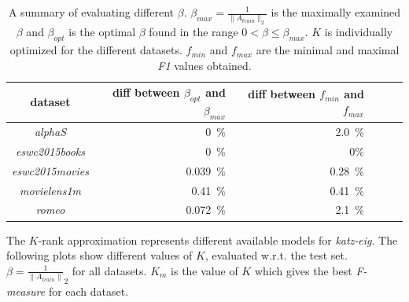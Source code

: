 \begin{table}[h!]
    \centering
    \begin{tabular}{| c | r | r | r | r | l |}
        \hline
        \textbf{dataset}        & \textbf{diff between $\beta_{opt}$ and $\beta_{max}$ }    & \textbf{diff between $f_{min}$ and $f_{max}$} \\ \hline

        \textit{alphaS}         & 0~\%      & 2.0~\%    \\ \hline
        \textit{eswc2015books}  & 0~\%      & 0\%       \\ \hline
        \textit{eswc2015movies} & 0.039~\%  & 0.28~\%   \\ \hline
        \textit{movielens1m}    & 0.41~\%   & 0.41~\%   \\ \hline
        \textit{romeo}          & 0.072~\%  & 2.1~\%    \\ \hline


    \end{tabular}
    \caption{A summary of evaluating different $\beta$. $\beta_{max} = \frac{1}{\|A_{train}\|_2}$ is the maximally examined $\beta$ and $\beta_{opt}$ is the optimal $\beta$ found in the range $0 < \beta \leq \beta_{max}$. $K$ is individually optimized for the different datasets. $f_{min}$ and $f_{max}$ are the minimal and maximal \textit{F1} values obtained.}
    \label{tab:katzeig_beta}
\end{table}

\FloatBarrier

\newpage


The $K$-rank approximation represents different available models for \textit{katz-eig}. The following plots show different values of $K$, evaluated w.r.t. the test set. $\beta = \frac{1}{\|A_{train}\|}_2$ for all datasets. $K_{m}$ is the value of $K$ which gives the best \textit{F-measure} for each dataset.

\FloatBarrier

